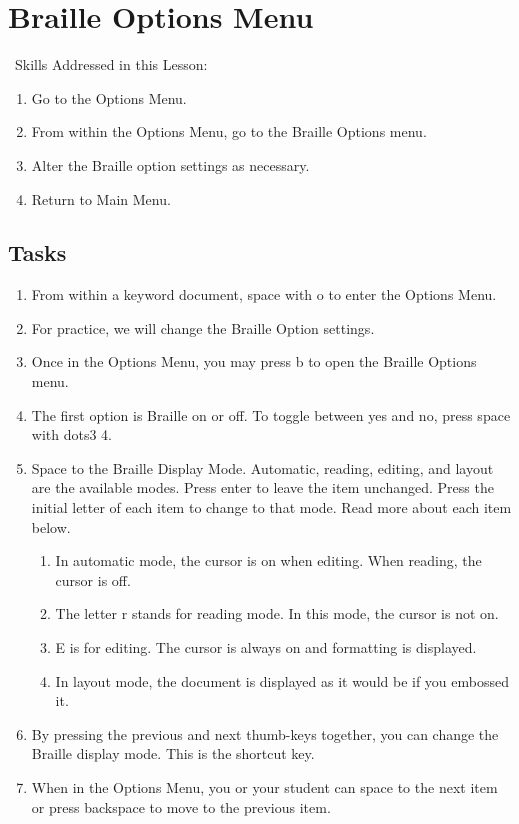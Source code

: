 \documentclass[10pt,letterpaper,twoside]{report}
\begin{document}
{{{\section{ Braille Options Menu}
\
Skills Addressed in this Lesson:
\begin{enumerate}
	\item Go to the Options Menu.
	\item From within the Options Menu, go to the Braille Options menu.
	\item Alter the Braille option settings as necessary.
	\item Return to Main Menu.
\end{enumerate}
\subsection{Tasks}
\begin{enumerate}
	\item From within a keyword document, space with o to enter the Options Menu.
	\item For practice, we will change the Braille Option settings.
	\item Once in the Options Menu, you may press b to open the Braille Options menu.
	\item The first option is Braille on or off.  To toggle between yes and no, press space with dots3 4.
	\item Space to the Braille Display Mode.  Automatic, reading, editing, and layout are the available modes.  Press enter to leave the item unchanged. Press the initial letter of each item to change to that mode.  Read more about each item below.
	      \begin{enumerate}
		      \item In automatic mode, the cursor is on when editing.  When reading, the cursor is off.
		      \item The letter r stands for reading mode.  In this mode, the cursor is not on.
		      \item E is for editing.  The cursor is always on and formatting is displayed.
		      \item In layout mode, the document is displayed as it would be if you embossed it.
	      \end{enumerate}
	\item By pressing the previous and next thumb-keys together, you can change the Braille display mode.  This is the shortcut key.
	\item When in the Options Menu, you or your student can space to the next item or press backspace to move to the previous item.

\end{enumerate}}}}
\end{document}
